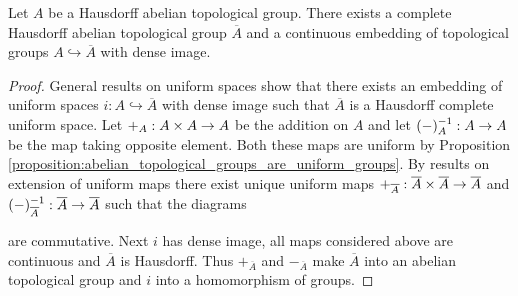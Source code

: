 \documentclass[10pt]{amsart}
\begin{document}
\begin{theorem}\label{theorem:completion_of_topological_group}
	Let $A$ be a Hausdorff abelian topological group. There exists a complete Hausdorff abelian topological group $\overline{A}$ and a continuous embedding of topological groups $A \hookrightarrow \overline{A}$ with dense image.
\end{theorem}
\begin{proof}
	General results on uniform spaces show that there exists an embedding of uniform spaces $i:A\hookrightarrow \overline{A}$ with dense image such that $\overline{A}$ is a Hausdorff complete uniform space. Let $+_A:A\times A\rightarrow A$ be the addition on $A$ and let $(-)^{-1}_A:A\rightarrow A$ be the map taking opposite element. Both these maps are uniform by Proposition \ref{proposition:abelian_topological_groups_are_uniform_groups}. By results on extension of uniform maps there exist unique uniform maps $+_{\overline{A}}:\overline{A}\times \overline{A}\rightarrow \overline{A}$ and $(-)^{-1}_{\overline{A}}:\overline{A}\rightarrow \overline{A}$ such that the diagrams
	\begin{center}
	\end{center}
	are commutative. Next $i$ has dense image, all maps considered above are continuous and $\overline{A}$ is Hausdorff. Thus $+_{\overline{A}}$ and $-_{\overline{A}}$ make $\overline{A}$ into an abelian topological group and $i$ into a homomorphism of groups.


\end{proof}
\end{document}
